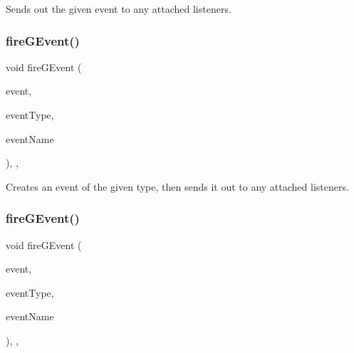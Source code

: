 Sends out the given event to any attached listeners. 

\mbox{\label{classsgl_1_1GObservable_ab3983ea07337b52020a29cc00c653d8d}} 
\subsubsection{\texorpdfstring{fire\+G\+Event()}{fireGEvent()}\hspace{0.1cm}{\footnotesize\ttfamily [1/8]}}
{\footnotesize\ttfamily void fire\+G\+Event (\begin{DoxyParamCaption}\item[{Q\+Event $\ast$}]{event,  }\item[{\mbox{\hyperlink{namespacesgl_a2628ea8d12e8b2563c32f05dc7fff6fa}{Event\+Type}}}]{event\+Type,  }\item[{const std\+::string \&}]{event\+Name }\end{DoxyParamCaption})\hspace{0.3cm}{\ttfamily [protected]}, {\ttfamily [virtual]}, {\ttfamily [inherited]}}



Creates an event of the given type, then sends it out to any attached listeners. 

\mbox{\label{classsgl_1_1GObservable_a01fdf1b0e0dbd49e189fe4514e010411}} 
\subsubsection{\texorpdfstring{fire\+G\+Event()}{fireGEvent()}\hspace{0.1cm}{\footnotesize\ttfamily [2/8]}}
{\footnotesize\ttfamily void fire\+G\+Event (\begin{DoxyParamCaption}\item[{Q\+Close\+Event $\ast$}]{event,  }\item[{\mbox{\hyperlink{namespacesgl_a2628ea8d12e8b2563c32f05dc7fff6fa}{Event\+Type}}}]{event\+Type,  }\item[{const std\+::string \&}]{event\+Name }\end{DoxyParamCaption})\hspace{0.3cm}{\ttfamily [protected]}, {\ttfamily [virtual]}, {\ttfamily [inherited]}}



